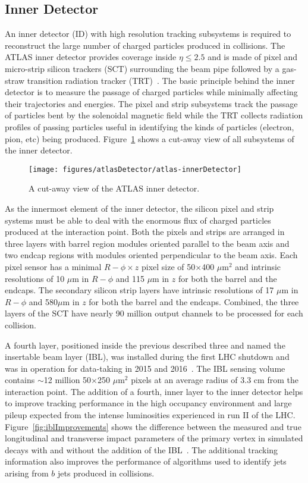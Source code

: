 \subsection{Inner Detector}
An inner detector (ID) with high resolution tracking subsystems is required to reconstruct the large number of charged particles produced in collisions. The ATLAS inner detector provides coverage inside \textbar$\eta$\textbar$\leq 2.5$ and is made of pixel and micro-strip silicon trackers (SCT) surrounding the beam pipe followed by a gas-straw transition radiation tracker (TRT)~\cite{ATLAS:1997ag, ATLAS:1997af}. The basic principle behind the inner detector is to measure the passage of charged particles while minimally affecting their trajectories and energies. The pixel and strip subsystems track the passage of particles bent by the solenoidal magnetic field while the TRT collects radiation profiles of passing particles useful in identifying the kinds of particles (electron, pion, etc) being produced. Figure~\ref{fig:atlas-innerDetector} shows a cut-away view of all subsystems of the inner detector.

\begin{figure}[h!]
\centering
\label{fig:atlas-innerDetector}
\texttt{[image: figures/atlasDetector/atlas-innerDetector]}
\caption{A cut-away view of the ATLAS inner detector.}
\end{figure}

As the innermost element of the inner detector, the silicon pixel and strip systems must be able to deal with the enormous flux of charged particles produced at the interaction point. Both the pixels and strips are arranged in three layers with barrel region modules oriented parallel to the beam axis and two endcap regions with modules oriented perpendicular to the beam axis. Each pixel sensor has a minimal $R-\phi\times z$ pixel size of 50$\times$400 $\mu$m$^2$ and intrinsic resolutions of 10 $\mu$m in $R-\phi$ and 115 $\mu$m in $z$ for both the barrel and the endcaps. The secondary silicon strip layers have intrinsic resolutions of 17 $\mu$m in $R-\phi$ and 580$\mu$m in $z$ for both the barrel and the endcaps. Combined, the three layers of the SCT have nearly 90 million output channels to be processed for each collision.

A fourth layer, positioned inside the previous described three and named the insertable beam layer (IBL), was installed during the first LHC shutdown and was in operation for data-taking in 2015 and 2016~\cite{Capeans:1291633}. The IBL sensing volume contains $\sim$12 million 50$\times$250 $\mu$m$^2$ pixels at an average radius of 3.3 cm from the interaction point. The addition of a fourth, inner layer to the inner detector helps to improve tracking performance in the high occupancy environment and large pileup expected from the intense luminosities experienced in run II of the LHC. Figure~\ref{fig:iblImprovements} shows the difference between the measured and true longitudinal and transverse impact parameters of the primary vertex in simulated \ttbar decays with and without the addition of the IBL~\cite{Capeans:1291633}. The additional tracking information also improves the performance of algorithms used to identify jets arising from $b$ jets produced in collisions.

